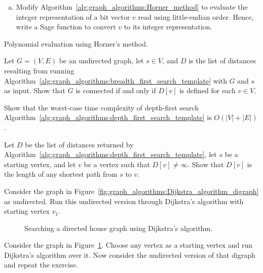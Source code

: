 \begin{problem}
\begin{enumerate}[(a)]
  \item Modify Algorithm~\ref{alg:graph_algorithms:Horner_method} to
    evaluate the integer representation of a bit vector $v$ read using
    little-endian order. Hence, write a Sage function to convert $v$
    to its integer representation.
  \end{enumerate}

\begin{algorithm}[!htbp]

\caption{Polynomial evaluation using Horner's method.}
\label{alg:graph_algorithms:Horner_method}
\end{algorithm}

\item Let $G = (V, E)$ be an undirected graph, let $s \in V$, and $D$
  is the list of distances resulting from running
  Algorithm~\ref{alg:graph_algorithms:breadth_first_search_template}
  with $G$ and $s$ as input. Show that $G$ is connected if and only if
  $D[v]$ is defined for each $v \in V$.

\item Show that the worst-case time complexity of depth-first search
  Algorithm~\ref{alg:graph_algorithms:depth_first_search_template} is
  $O(|V| + |E|)$.

\item Let $D$ be the list of distances returned by
  Algorithm~\ref{alg:graph_algorithms:depth_first_search_template},
  let $s$ be a starting vertex, and let $v$ be a vertex such that
  $D[v] \neq \infty$. Show that $D[v]$ is the length of any shortest
  path from $s$ to $v$.

\item Consider the graph in
  Figure~\ref{fig:graph_algorithms:Dijkstra_algorithm_digraph} as
  undirected. Run this undirected version through Dijkstra's algorithm
  with starting vertex $v_1$.

\begin{figure}[!htbp]
\centering

\caption{Searching a directed house graph using Dijkstra's algorithm.}
\label{fig:graph_algorithms:Dijkstra_directed_house_graph}
\end{figure}

\item Consider the graph in
  Figure~\ref{fig:graph_algorithms:Dijkstra_directed_house_graph}. Choose
  any vertex as a starting vertex and run Dijkstra's algorithm over
  it. Now consider the undirected version of that digraph and repeat
  the exercise.


\end{problem}

